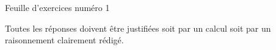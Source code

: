 \documentclass[a4paper,12pt,draft]{article}
\begin{document}

\thispagestyle{empty}

\large
\begin{center}
    Feuille d'exercices numéro 1
\end{center}


\tiny
\begin{center}
    Toutes les réponses doivent être justifiées soit par un calcul soit par un raisonnement clairement rédigé.
\end{center}
\normalsize

\end{document}
